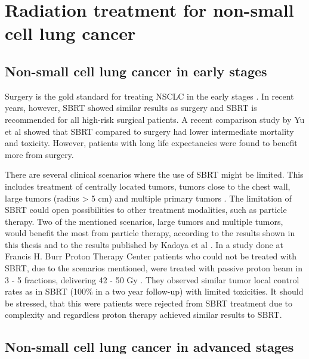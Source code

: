 \documentclass[type=dr, dr=rernat, accentcolor=tud7b,colorbacktitle, bigchapter, openright, twoside, 12pt ]{tudthesis}
\begin{document}
\newpage
\section{Radiation treatment for non-small cell lung cancer}

\subsection{Non-small cell lung cancer in early stages}

Surgery is the gold standard for treating NSCLC in the early stages \cite{Roesch2014}. 
In recent years, however, SBRT showed similar results as surgery and SBRT is recommended for all high-risk surgical patients. A recent comparison study by Yu et al \cite{Yu2015} showed that
SBRT compared to surgery had lower intermediate mortality and toxicity. However, patients with long life expectancies were found to benefit more from surgery. 

There are several clinical scenarios where the use of SBRT might be limited. 
This includes treatment of centrally located tumors, tumors close to the chest wall, large tumors (radius > 5 cm) and 
multiple primary tumors \cite{Timmerman2006, Georg2008, Westover2012}.
The limitation of SBRT could open possibilities to other treatment modalities, such as particle therapy. 
Two of the mentioned scenarios, large tumors and multiple tumors, would benefit the most from particle therapy, according to the results shown
in this thesis and to the results published by Kadoya et al \cite{Kadoya2010}. In a study done at Francis H. Burr Proton Therapy Center 
patients who could not be treated with SBRT, due to the scenarios mentioned, were treated with passive proton beam in 3 - 5 fractions, 
delivering 42 - 50 Gy \cite{Westover2012}. They observed similar tumor local control rates as in SBRT (100\% in a two year follow-up) with limited toxicities. 
It should be stressed, that this were patients were rejected from SBRT treatment due to complexity and regardless proton therapy achieved similar results
to SBRT.


\subsection{Non-small cell lung cancer in advanced stages}
\end{document}
